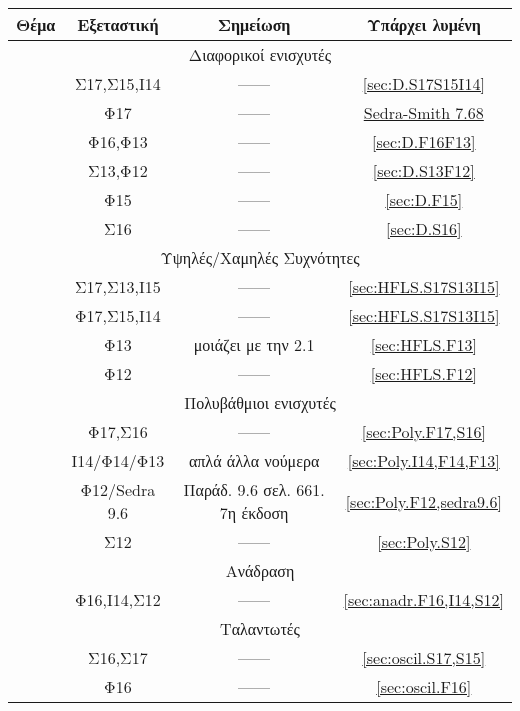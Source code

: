\documentclass[11pt,a4paper,titlepage,fleqn]{article}
\begin{document}
\begin{center}
	\begin{tabular}{||c c c c||} 
		\hline
		Θέμα & Εξεταστική & Σημείωση & Υπάρχει λυμένη \\ [0.5ex] 
		\hline\hline
		\multicolumn{4}{||c||}{Διαφορικοί ενισχυτές} \\ 
		\hline
		\rownumber & Σ17,Σ15,Ι14 & ------ & \autoref{sec:D.S17S15I14} \\
		\hline
		\rownumber & Φ17 & ------ & \hyperref[sec:D.sedra_smith7.68]{Sedra-Smith 7.68} \\
		\hline
		\rownumber & Φ16,Φ13 & ------ & \autoref{sec:D.F16F13}\\
		\hline
		\rownumber & Σ13,Φ12 & ------ & \autoref{sec:D.S13F12} \\
		\hline
		\rownumber & Φ15 & ------ & \autoref{sec:D.F15} \\
		\hline
		\rownumber & Σ16 & ------ & \autoref{sec:D.S16} \\ [1ex] 
		\hline
		
		\multicolumn{4}{||c||}{Υψηλές/Χαμηλές Συχνότητες} \\ 
		\hline
		\setcounter{magicrownumbers}{0}
		\rownumber & Σ17,Σ13,Ι15 & ------ & \autoref{sec:HFLS.S17S13I15}\\
		\hline
		\rownumber & Φ17,Σ15,Ι14 & ------ & \autoref{sec:HFLS.S17S13I15} \\
		\hline
		\rownumber & Φ13 & μοιάζει με την 2.1 & \autoref{sec:HFLS.F13} \\
		\hline
		\rownumber & Φ12 & ------ & \autoref{sec:HFLS.F12} \\
		\hline
		
		\multicolumn{4}{||c||}{Πολυβάθμιοι ενισχυτές} \\ 
		\hline
		\setcounter{magicrownumbers}{0}
		\rownumber & Φ17,Σ16 & ------ & \autoref{sec:Poly.F17,S16} \\
		\hline
		\rownumber & Ι14/Φ14/Φ13 & απλά άλλα νούμερα & \autoref{sec:Poly.I14,F14,F13} \\
		\hline
		\rownumber & Φ12/Sedra 9.6 & Παράδ. 9.6 σελ. 661. 7η έκδοση & \autoref{sec:Poly.F12,sedra9.6} \\
		\hline
		\rownumber & Σ12 & ------ & \autoref{sec:Poly.S12} \\
		\hline
		\multicolumn{4}{||c||}{Ανάδραση} \\ 
		\hline
		\setcounter{magicrownumbers}{0}
		\rownumber & Φ16,Ι14,Σ12 & ------ & \autoref{sec:anadr.F16,I14,S12} \\
		\hline
		\multicolumn{4}{||c||}{Ταλαντωτές} \\
		\hline
		\setcounter{magicrownumbers}{0}
		\rownumber & Σ16,Σ17 & ------ & \autoref{sec:oscil.S17,S15} \\
		\hline
		\rownumber & Φ16 & ------ & \autoref{sec:oscil.F16} \\
		\hline
		
		
	\end{tabular}
\end{center}
\end{document}
